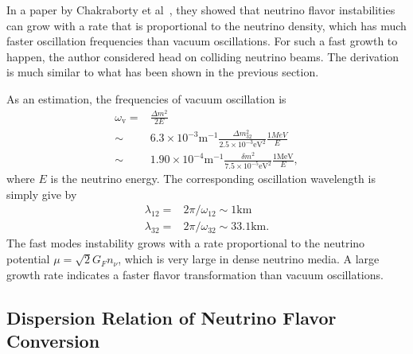 In a paper by Chakraborty et al~\cite{Chakraborty2016}, they showed that neutrino flavor instabilities can grow with a rate that is proportional to the neutrino density, which has much faster oscillation frequencies than vacuum oscillations. For such a fast growth to happen, the author considered head on colliding neutrino beams. The derivation is much similar to what has been shown in the previous section.

As an estimation, the frequencies of vacuum oscillation is
\begin{align*}
   \omega_{\mathrm v} =& \frac{\Delta m^2}{2E} \\ \sim& 6.3\times 10^{-3} \mathrm{m}^{-1}  \frac{\Delta m^2_{32}}{2.5\times 10^{-3} \mathrm{eV}^2 } \frac{1MeV}{E} \\
   \sim & 1.90\times 10^{-4}  \mathrm{m}^{-1}  \frac{\delta m^2}{7.5\times 10^{-5}\mathrm{eV}^2} \frac{1\mathrm{MeV}}{E},
\end{align*}
where $E$ is the neutrino energy. The corresponding oscillation wavelength is simply give by
\begin{align*}
   \lambda_{12} = & 2\pi/\omega_{12} \sim 1 \mathrm{km}\\
   \lambda_{32} = & 2\pi/\omega_{32} \sim 33.1 \mathrm{km}.
\end{align*}
The fast modes instability grows with a rate proportional to the neutrino potential $\mu=\sqrt{2}G_F n_\nu$, which is very large in dense neutrino media. A large growth rate indicates a faster flavor transformation than vacuum oscillations.










\subsection{\label{chap:dr-sec:fast-mode-subsec:dr}Dispersion Relation of Neutrino Flavor Conversion}


